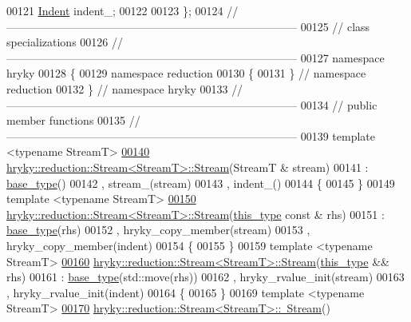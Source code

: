 \begin{DoxyCode}
00121     \hyperlink{classhryky_1_1_indent}{Indent}          indent\_;
00122 
00123 \};
00124 \textcolor{comment}{//
      ------------------------------------------------------------------------------}
00125 \textcolor{comment}{// class specializations}
00126 \textcolor{comment}{//
      ------------------------------------------------------------------------------}
00127 \textcolor{keyword}{namespace }hryky
00128 \{
00129 \textcolor{keyword}{namespace }reduction
00130 \{
00131 \} \textcolor{comment}{// namespace reduction}
00132 \} \textcolor{comment}{// namespace hryky}
00133 \textcolor{comment}{//
      ------------------------------------------------------------------------------}
00134 \textcolor{comment}{// public member functions}
00135 \textcolor{comment}{//
      ------------------------------------------------------------------------------}
00139 \textcolor{comment}{}\textcolor{keyword}{template} <\textcolor{keyword}{typename} StreamT>
\hypertarget{reduction__stream_8h_source_l00140}{}\hyperlink{classhryky_1_1reduction_1_1_stream_aab5b1cf873b56b2d0d978a672cdc4f60}{00140} \hyperlink{classhryky_1_1reduction_1_1_stream}{hryky::reduction::Stream<StreamT>::Stream}(StreamT & stream)
00141     : \hyperlink{classhryky_1_1reduction_1_1_dispatcher}{base_type}()
00142       , stream\_(stream)
00143       , indent\_()
00144 \{
00145 \}
00149 \textcolor{keyword}{template} <\textcolor{keyword}{typename} StreamT>
\hypertarget{reduction__stream_8h_source_l00150}{}\hyperlink{classhryky_1_1reduction_1_1_stream_adf137cae6c9a457bf62cdd16b380ae4e}{00150} \hyperlink{classhryky_1_1reduction_1_1_stream}{hryky::reduction::Stream<StreamT>::Stream}(\hyperlink{classhryky_1_1reduction_1_1_dispatcher}{this_type} \textcolor{keyword}{const} & rhs)
00151     : \hyperlink{classhryky_1_1reduction_1_1_dispatcher}{base_type}(rhs)
00152       , hryky\_copy\_member(stream)
00153       , hryky\_copy\_member(indent)
00154 \{
00155 \}
00159 \textcolor{keyword}{template} <\textcolor{keyword}{typename} StreamT>
\hypertarget{reduction__stream_8h_source_l00160}{}\hyperlink{classhryky_1_1reduction_1_1_stream_aa7e38fe1e80a40307e1cd5553c6132b3}{00160} \hyperlink{classhryky_1_1reduction_1_1_stream}{hryky::reduction::Stream<StreamT>::Stream}(\hyperlink{classhryky_1_1reduction_1_1_dispatcher}{this_type} && rhs)
00161     : \hyperlink{classhryky_1_1reduction_1_1_dispatcher}{base_type}(std::move(rhs))
00162       , hryky\_rvalue\_init(stream)
00163       , hryky\_rvalue\_init(indent)
00164 \{
00165 \}
00169 \textcolor{keyword}{template} <\textcolor{keyword}{typename} StreamT>
\hypertarget{reduction__stream_8h_source_l00170}{}\hyperlink{classhryky_1_1reduction_1_1_stream_a868cb56653b1cfee77a157a2ea7fe783}{00170} \hyperlink{classhryky_1_1reduction_1_1_stream}{hryky::reduction::Stream<StreamT>::~Stream}()

\end{DoxyCode}
